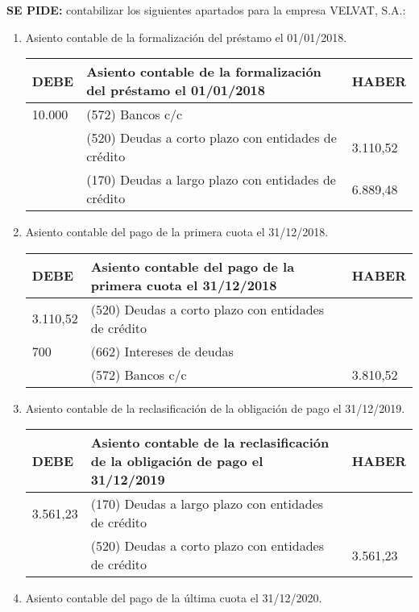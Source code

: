 \textbf{SE PIDE:} contabilizar los siguientes apartados para la empresa VELVAT, S.A.:
\begin{enumerate}[label=\alph*)]
\item Asiento contable de la formalización del préstamo el 01/01/2018.

\begin{table}[H]
\centering
\begin{tabular}{|p{2cm}|p{8cm}|p{2cm}|}
\hline
\rowcolor{blue!30}
\textbf{DEBE} & \textbf{Asiento contable de la formalización del préstamo el 01/01/2018} & \textbf{HABER} \\ \hline
10.000 & (572) Bancos c/c & \\ \hline
& (520) Deudas a corto plazo con entidades de crédito & 3.110,52 \\ \hline
& (170) Deudas a largo plazo con entidades de crédito & 6.889,48 \\ \hline
\end{tabular}
\end{table}

\item Asiento contable del pago de la primera cuota el 31/12/2018.

\begin{table}[H]
\centering
\begin{tabular}{|p{2cm}|p{8cm}|p{2cm}|}
\hline
\rowcolor{blue!30}
\textbf{DEBE} & \textbf{Asiento contable del pago de la primera cuota el 31/12/2018} & \textbf{HABER} \\ \hline
3.110,52 & (520) Deudas a corto plazo con entidades de crédito & \\ \hline
700 & (662) Intereses de deudas & \\ \hline
& (572) Bancos c/c & 3.810,52 \\ \hline
\end{tabular}
\end{table}

\item Asiento contable de la reclasificación de la obligación de pago el 31/12/2019.

\begin{table}[H]
\centering
\begin{tabular}{|p{2cm}|p{8cm}|p{2cm}|}
\hline
\rowcolor{blue!30}
\textbf{DEBE} & \textbf{Asiento contable de la reclasificación de la obligación de pago el 31/12/2019} & \textbf{HABER} \\ \hline
3.561,23 & (170) Deudas a largo plazo con entidades de crédito & \\ \hline
& (520) Deudas a corto plazo con entidades de crédito & 3.561,23 \\ \hline
\end{tabular}
\end{table}

\item Asiento contable del pago de la última cuota el 31/12/2020.
\end{enumerate}

